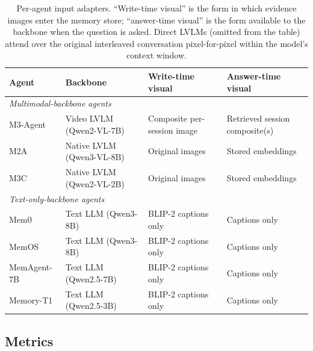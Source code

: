 \documentclass{llmxive}
\begin{document}
\begin{table}[!htbp]
\centering
\small
\begin{tabular}{llll}
\toprule
\textbf{Agent} & \textbf{Backbone} & \textbf{Write-time visual} & \textbf{Answer-time visual} \\
\midrule
\multicolumn{4}{l}{\textit{Multimodal-backbone agents}} \\
\midrule
M3-Agent      & Video LVLM (Qwen2-VL-7B)    & Composite per-session image       & Retrieved session composite(s) \\
M2A           & Native LVLM (Qwen3-VL-8B)   & Original images                   & Stored embeddings \\
M3C           & Native LVLM (Qwen2-VL-2B)   & Original images                   & Stored embeddings \\
\midrule
\multicolumn{4}{l}{\textit{Text-only-backbone agents}} \\
\midrule
Mem0          & Text LLM (Qwen3-8B)        & BLIP-2 captions only              & Captions only \\
MemOS         & Text LLM (Qwen3-8B)        & BLIP-2 captions only              & Captions only \\
MemAgent-7B   & Text LLM (Qwen2.5-7B)      & BLIP-2 captions only              & Captions only \\
Memory-T1     & Text LLM (Qwen2.5-3B)      & BLIP-2 captions only              & Captions only \\
\bottomrule
\end{tabular}
\caption{Per-agent input adapters. ``Write-time visual'' is the form in which evidence images enter the memory store; ``answer-time visual'' is the form available to the backbone when the question is asked. Direct LVLMs (omitted from the table) attend over the original interleaved conversation pixel-for-pixel within the model's context window.}
\label{tab:agent_adapters}
\end{table}

\subsection{Metrics}
\label{subsec:metrics}
\end{document}
